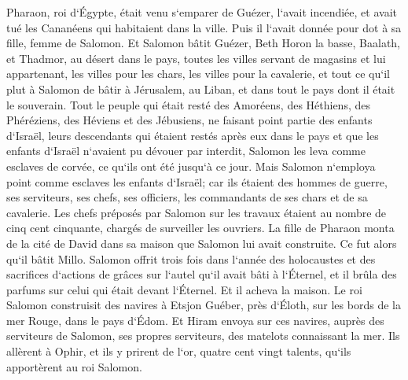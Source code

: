 \verse Pharaon, roi d`Égypte, était venu s`emparer de Guézer, l`avait incendiée, et avait tué les Cananéens qui habitaient dans la ville. Puis il l`avait donnée pour dot à sa fille, femme de Salomon. 
\verse Et Salomon bâtit Guézer, Beth Horon la basse, 
\verse Baalath, et Thadmor, au désert dans le pays, 
\verse toutes les villes servant de magasins et lui appartenant, les villes pour les chars, les villes pour la cavalerie, et tout ce qu`il plut à Salomon de bâtir à Jérusalem, au Liban, et dans tout le pays dont il était le souverain. 
\verse Tout le peuple qui était resté des Amoréens, des Héthiens, des Phéréziens, des Héviens et des Jébusiens, ne faisant point partie des enfants d`Israël, 
\verse leurs descendants qui étaient restés après eux dans le pays et que les enfants d`Israël n`avaient pu dévouer par interdit, Salomon les leva comme esclaves de corvée, ce qu`ils ont été jusqu`à ce jour. 
\verse Mais Salomon n`employa point comme esclaves les enfants d`Israël; car ils étaient des hommes de guerre, ses serviteurs, ses chefs, ses officiers, les commandants de ses chars et de sa cavalerie. 
\verse Les chefs préposés par Salomon sur les travaux étaient au nombre de cinq cent cinquante, chargés de surveiller les ouvriers. 
\verse La fille de Pharaon monta de la cité de David dans sa maison que Salomon lui avait construite. Ce fut alors qu`il bâtit Millo. 
\verse Salomon offrit trois fois dans l`année des holocaustes et des sacrifices d`actions de grâces sur l`autel qu`il avait bâti à l`Éternel, et il brûla des parfums sur celui qui était devant l`Éternel. Et il acheva la maison. 
\verse Le roi Salomon construisit des navires à Etsjon Guéber, près d`Éloth, sur les bords de la mer Rouge, dans le pays d`Édom. 
\verse Et Hiram envoya sur ces navires, auprès des serviteurs de Salomon, ses propres serviteurs, des matelots connaissant la mer. 
\verse Ils allèrent à Ophir, et ils y prirent de l`or, quatre cent vingt talents, qu`ils apportèrent au roi Salomon. 

